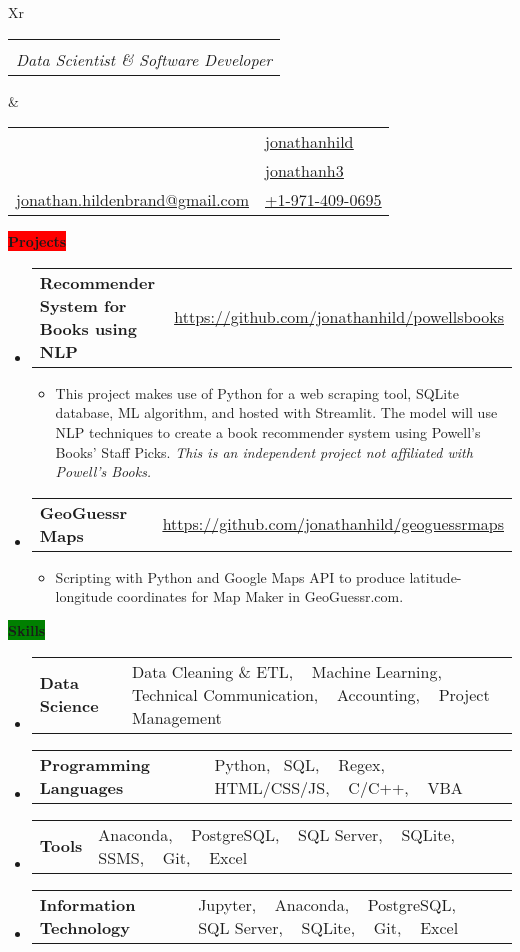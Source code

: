 \documentclass[letterpaper,12pt]{article}[leftmargin=*]
\makeatletter
\def \fullname {Jonathan Hildenbrand}
\def \subtitle {Data Scientist \& Software Developer}
\def \githubicon {\faGithub}
\def \githublink {https://github.com/jonathanhild}
\def \githubtext {jonathanhild}
\def \linkedinicon {\faLinkedin}
\def \linkedinlink {https://linkedin.com/in/jonathanh3}
\def \linkedintext {jonathanh3}
\def \phoneicon {\faPhone}
\def \phonelink {tel:+1971-409-0695}
\def \phonetext {+1-971-409-0695}
\def \emailicon {\faEnvelope}
\def \emaillink {mailto:jonathan.hildenbrand@gmail.com}
\def \emailtext {jonathan.hildenbrand@gmail.com}
\def \locationicon {\faMapMarker}
\def \locationtext {Portland, OR, USA}
\def \targeticon {\faBinoculars}
\def \targettext {Local \& Remote WFH}
\def \headertype {\doublecol} %
\def \entryspacing {-0pt}
\def \location {\locationicon \hspace{3pt}{\locationtext}}
\def \target {\targeticon \hspace{3pt}{\targettext}}
\def \phone {\phoneicon \hspace{3pt}\href{\phonelink}{\underline{\phonetext}}}
\def \linkedin {\linkedinicon \hspace{3pt}\href{\linkedinlink}{\underline{\linkedintext}}}
\def \email {\emailicon \hspace{3pt}\href{\emaillink}{\underline{\emailtext}}}
\def \github {\githubicon \hspace{3pt}\href{\githublink}{\underline{\githubtext}}}
\newcommand{\projects}[2]{\vspace{6pt}
  \colorbox{Red}{\color{white}\raggedbottom\normalsize\textbf{{#1}{\hspace{9pt}#2\hspace{4pt}}}}
}
\newcommand{\skills}[2]{\vspace{6pt}
  \colorbox{Green}{\color{white}\raggedbottom\normalsize\textbf{{#1}{\hspace{9pt}#2\hspace{4pt}}}}
}
\newcommand{\resumeEntryStart}{\begin{itemize}[leftmargin=2.5mm]}
\newcommand{\resumeEntryEnd}{\end{itemize}\vspace{\entryspacing}}
\newcommand{\resumeItemListStart}{\begin{itemize}[leftmargin=4.5mm]}
\newcommand{\resumeItemListEnd}{\end{itemize}}
\newcommand{\resumeItem}[1]{
  \item\small{
    {#1 \vspace{-2pt}}
  }
}
\newcommand{\resumeEntryTD}[2]{
  \vspace{-1pt}\item[]
    \begin{tabularx}{0.97\textwidth}{X@{\hspace{60pt}}r}
      \textbf{\color{primary}#1} & {\firabook\color{accent}\small#2} \\
    \end{tabularx}\vspace{-6pt}
}
\newcommand{\resumeEntryS}[2]{
  \item[]
    \vspace{-1pt}
      \begin{tabular}{ p{2in} m{5.5in} }
      {\small{\textbf{#1 }}} & {\small{#2}}
      \end{tabular}\vspace{-6pt}
}
\newcommand{\doublecol}[6]{
  \begin{tabularx}{\textwidth}{Xr}
    {
      \begin{tabular}[c]{l}
        \fontsize{24}{34}\selectfont{\color{primary}{{\textbf{\fullname}}}} \\
        {\textit{\subtitle}} %
      \end{tabular}
    } & {
      \begin{tabular}[c]{l@{\hspace{1.5em}}l}
        {\small#4} & {\small#1} \\
        {\small#5} & {\small#2} \\
        {\small#6} & {\small#3}
      \end{tabular}
    }
  \end{tabularx}
}
\newcommand{\singlecol}[6]{
  \begin{tabularx}{\textwidth}{Xr}
    {
      \begin{tabular}[b]{l}
        \fontsize{35}{45}\selectfont{\color{primary}{{\textbf{\fullname}}}} \\
        {\textit{\subtitle}} %
      \end{tabular}
    } & {
      \begin{tabular}[c]{l}
        {\small#1} \\
        {\small#2} \\
        {\small#3} \\
        {\small#4} \\
        {\small#5} \\
        {\small#6}
      \end{tabular}
    }
  \end{tabularx}
}
\makeatother
\begin{document}

\headertype{\github}{\linkedin}{\phone}{\location}{\target}{\email} %

\projects{\faFlask}{Projects}

  \resumeEntryStart
    \resumeEntryTD
      {Recommender System for Books using NLP}{\href{https://github.com/jonathanhild/powellsbooks}{\underline{https://github.com/jonathanhild/powellsbooks}}}
    \resumeItemListStart
      \resumeItem {This project makes use of Python for a web scraping tool, SQLite database, ML algorithm, and hosted with Streamlit. The model will use NLP techniques to create a book recommender system using Powell's Books' Staff Picks. \textit{This is an independent project not affiliated with Powell’s Books.}}
    \resumeItemListEnd
  \resumeEntryTD
      {GeoGuessr Maps}{\href{https://github.com/jonathanhild/geoguessrmaps}{\underline{https://github.com/jonathanhild/geoguessrmaps}}}
    \resumeItemListStart
      \resumeItem {Scripting with Python and Google Maps API to produce latitude-longitude coordinates for Map Maker in GeoGuessr.com.}
    \resumeItemListEnd
  \resumeEntryEnd

\skills{\faGears}{Skills}
 \resumeEntryStart
  \resumeEntryS{Data Science} {Data Cleaning \& ETL, ~ Machine Learning, ~ Technical Communication, ~ Accounting, ~ Project Management}
  \resumeEntryS{Programming Languages} {Python,~ SQL, ~ Regex, ~ HTML/CSS/JS, ~ C/C++, ~ VBA}
  \resumeEntryS{Tools} {Anaconda, ~ PostgreSQL, ~ SQL Server, ~ SQLite, ~ SSMS, ~ Git, ~ Excel}
  \resumeEntryS{Information Technology} {Jupyter, ~ Anaconda, ~ PostgreSQL, ~ SQL Server, ~ SQLite, ~ Git, ~ Excel}

 \resumeEntryEnd
 
\end{document}
